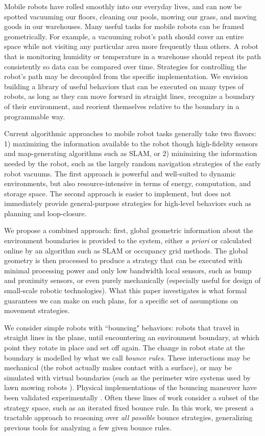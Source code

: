 \documentclass[sageh,times,Review]{sagej}
\begin{document}
Mobile robots have rolled smoothly into our everyday lives, and can now be
spotted vacuuming our floors, cleaning our pools, mowing our grass, and moving
goods in our warehouses. Many useful tasks for mobile robots can be framed
geometrically. For example, a 
vacuuming robot's path should cover an entire space while not visiting 
any particular area more frequently than others. A robot that is monitoring
humidity or temperature in a warehouse should repeat its path consistently so data 
can be compared over time. Strategies for controlling 
the robot's path may be decoupled from the specific implementation.
We envision building a library of useful behaviors that can be executed on many
types of robots, as long as they can move forward in straight lines, recognize a
boundary of their environment, and reorient themselves relative to the boundary in a
programmable way.

Current algorithmic approaches to mobile robot tasks generally take two flavors: 
1) maximizing
the information available to the robot though high-fidelity sensors and
map-generating algorithms such as SLAM, or 2) minimizing the information needed
by the robot, such as the largely random navigation strategies of the early
robot vacuums. The first approach is powerful and well-suited to dynamic
environments, but also resource-intensive in terms of energy, computation, and
storage space. The second approach is easier to implement, but does not
immediately provide general-purpose strategies for high-level behaviors such
as planning and loop-closure.

We propose a combined approach: first, global geometric information about the 
environment boundaries
is provided to the system, either \emph{a priori} or calculated online by an
algorithm such as SLAM or occupancy grid methods. The global geometry is then 
processed to produce a
strategy that can be executed with
minimal processing power and only low bandwidth local sensors, such as bump and
proximity sensors, or even purely mechanically (especially useful for design of
small-scale robotic technologies).
What this paper investigates is what formal guarantees we can make on such
plans, for a specific set of assumptions on movement strategies.

We consider simple robots with ``bouncing" behaviors: robots that
travel in straight lines in the plane, until encountering an environment
boundary, at which point they rotate in place and set off again. The change in
robot state at the boundary is modelled by what we call {\em bounce rules}.
These interactions may be mechanical (the robot actually makes contact with a
surface), or may be simulated with
virtual boundaries (such as the perimeter wire systems used by lawn mowing robots
\cite{sahin2007household}). Physical implementations of the bouncing maneuver have
been validated experimentally \cite{alam2018space,LewOKa13}.
Often these lines of work consider a subset of the strategy space, such as an iterated fixed bounce rule. In this work, 
we present a tractable approach to reasoning over {\em all possible} bounce strategies,
generalizing previous tools for analyzing a few given bounce rules.
\end{document}
